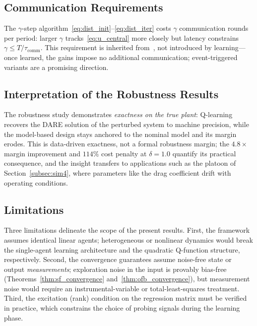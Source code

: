 \documentclass[final,5p,times]{elsarticle}
\theoremstyle{plain}
\theoremstyle{definition}
\theoremstyle{remark}
\begin{document}
\subsection{Communication Requirements}
\label{subsec:communication}
The $\gamma$-step algorithm~\eqref{eq:dist_init}--\eqref{eq:dist_iter} costs $\gamma$ communication rounds per period: larger $\gamma$ tracks~\eqref{eq:u_central} more closely but latency constrains $\gamma \leq T/\tau_{\mathrm{comm}}$. This requirement is inherited from~\cite{cacace2024}, not introduced by learning---once learned, the gains impose no additional communication; event-triggered variants are a promising direction.
\subsection{Interpretation of the Robustness Results}
\label{subsec:robust_disc}
The robustness study demonstrates \emph{exactness on the true plant}: Q-learning recovers the DARE solution of the perturbed system to machine precision, while the model-based design stays anchored to the nominal model and its margin erodes. This is data-driven exactness, not a formal robustness margin; the $4.8\times$ margin improvement and $114\%$ cost penalty at $\delta = 1.0$ quantify its practical consequence, and the insight transfers to applications such as the platoon of Section~\ref{subsec:sim4}, where parameters like the drag coefficient drift with operating conditions.
\subsection{Limitations}
\label{subsec:limitations}
Three limitations delineate the scope of the present results. First, the framework assumes identical linear agents; heterogeneous or nonlinear dynamics would break the single-agent learning architecture and the quadratic Q-function structure, respectively. Second, the convergence guarantees assume noise-free state or output \emph{measurements}; exploration noise in the input is provably bias-free (Theorems~\ref{thm:sf_convergence} and~\ref{thm:ofb_convergence}), but measurement noise would require an instrumental-variable or total-least-squares treatment. Third, the excitation (rank) condition on the regression matrix must be verified in practice, which constrains the choice of probing signals during the learning phase.
\end{document}
